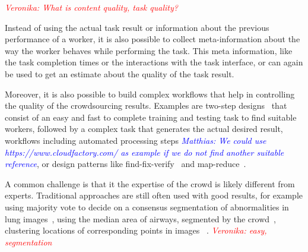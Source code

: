 \documentclass[10pt,twocolumn,letterpaper]{article}
\newcommand{\matthias}[1]{\emph{\textcolor{blue}{Matthias: #1}}}
\newcommand{\veronika}[1]{\emph{\textcolor{red}{Veronika: #1}}}
\begin{document}
\veronika{What is content quality, task quality?}

Instead of using the actual task result or information about the previous performance of a worker, it is also possible to collect meta-information about the way the worker behaves while performing the task.
This meta information, like the task completion times or the interactions with the task interface, or can again be used to get an estimate about the quality of the task result\cite{hirth2014predicting, kazai2016quality, mok2017detecting, goyal2018your}.



Moreover, it is also possible to build complex workflows that help in controlling the quality of the crowdsourcing results.
Examples are two-step designs~\cite{hossfeld2014best} that consist of an easy and fast to complete training and testing task to find suitable workers, followed by a complex task that generates the actual desired result, workflows including automated processing steps \matthias{We could use https://www.cloudfactory.com/ as example if we do not find another suitable reference}, or design patterns like find-fix-verify~\cite{bernstein2010soylent} and map-reduce~\cite{kittur2011crowdforge}.





A common challenge is that it the expertise of the crowd is likely different from experts. Traditional approaches are still often used with good results, for example using majority vote to decide on a consensus segmentation of abnormalities in lung images~\cite{oneil2017crowdsourcing}, using the median area of airways, segmented by the crowd~\cite{cheplygina2016early}, clustering locations of corresponding points in images ~\cite{maier2015crowdtruth}. \veronika{easy, segmentation}
\end{document}
